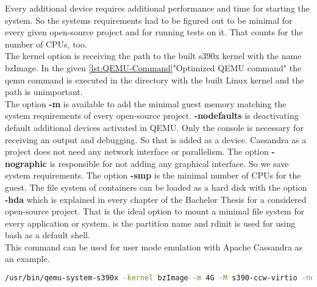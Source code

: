 Every additional device requires additional performance and time for starting the system. 
So the systems requirements had to be figured out to be minimal for every given open-source project and for running tests on it. 
That counts for the number of CPUs, too. \\

The kernel option is receiving the path to the built s390x kernel with the name bzImage. In the given \ref{lst:QEMU-Command}"Optimized QEMU command" the qemu command is executed in the directory with the built Linux kernel and the path is unimportant. \\ 
The option \textbf{-m} is available to add the minimal guest memory matching the system requirements of every open-source project. 
\textbf{-nodefaults} is deactivating default additional devices activated in QEMU. 
Only the console is necessary for receiving an output and debugging. 
So that is added as a device. Cassandra as a project does not need any network interface or parallelism. The 
option \textbf{-nographic} is responsible for not adding any graphical interface. 
So we save system requirements. The option \textbf{-smp} is the minimal number of CPUs for the guest. 
The file system of containers can be loaded as a hard disk with the option \textbf{-hda} which is explained in every chapter of the Bachelor Thesis for a considered open-source project. 
That is the ideal option to mount a minimal file system for every application or system. 
 is the partition name and rdinit is used for using bash as a default shell. \\
This command can be used for user mode emulation with Apache Cassandra as an example.


\begin{lstlisting}[language=bash,caption={Optimized QEMU Command},captionpos=b,label={lst:QEMU-Command}]
/usr/bin/qemu-system-s390x -kernel bzImage -m 4G -M s390-ccw-virtio -nodefaults -device sclpconsole,chardev=console -parallel none -net none -chardev stdio,id=console,signal=off,mux=on -mon chardev=console -nographic -smp 3 -hda /data/cassandra.img --append 'root=/dev/vda rw console=ttyS0 rdinit=/bin/bash'
\end{lstlisting}


